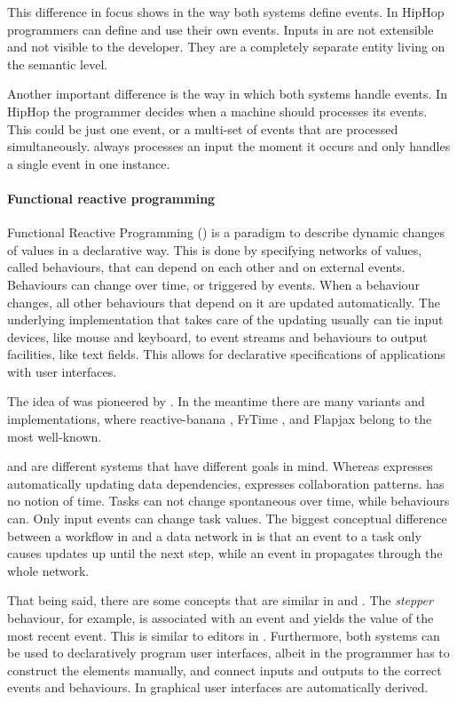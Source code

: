 This difference in focus shows in the way both systems define events.
In HipHop programmers can define and use their own events.
Inputs in \TOPHAT are not extensible and not visible to the developer.
They are a completely separate entity living on the semantic level.

Another important difference is the way in which both systems handle events.
In HipHop the programmer decides when a machine should processes its events.
This could be just one event, or a multi-set of events that are processed simultaneously.
\TOPHAT always processes an input the moment it occurs and only handles a single event in one instance.



\paragraph{Functional reactive programming}

Functional Reactive Programming (\FRP) is a paradigm to describe dynamic changes of values in a declarative way.
This is done by specifying networks of values, called behaviours, that can depend on each other and on external events.
Behaviours can change over time, or triggered by events.
When a behaviour changes, all other behaviours that depend on it are updated automatically.
The underlying implementation that takes care of the updating usually can tie input devices, like mouse and keyboard, to event streams and behaviours to output facilities, like text fields.
This allows for declarative specifications of applications with user interfaces.

The idea of \FRP was pioneered by \citet{conf/icfp/ElliottH97}.
In the meantime there are many variants and implementations, where reactive-banana \cite{reactive-banana}, FrTime \cite{CooperK04}, and Flapjax \cite{conf/oopsla/MeyerovichGBCGBK09} belong to the most well-known.

\FRP and \TOP are different systems that have different goals in mind.
Whereas \FRP expresses automatically updating data dependencies, \TOP expresses collaboration patterns.
\TOP has no notion of time.
Tasks can not change spontaneous over time, while behaviours can.
Only input events can change task values.
The biggest conceptual difference between a workflow in \TOP and a data network in \FRP is that an event to a task only causes updates up until the next step, while an event in \FRP propagates through the whole network.

That being said, there are some concepts that are similar in \TOP and \FRP.
The \emph{stepper} behaviour, for example, is associated with an event and yields the value of the most recent event.
This is similar to editors in \TOP.
Furthermore, both systems can be used to declaratively program user interfaces, albeit in \FRP the programmer has to construct the \GUI elements manually, and connect inputs and outputs to the correct events and behaviours.
In \TOP graphical user interfaces are automatically derived.



